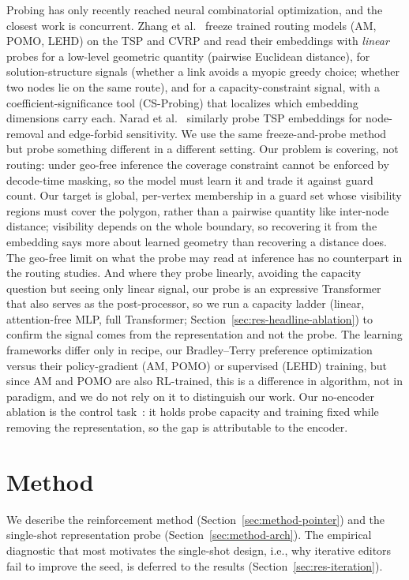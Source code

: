 \documentclass[11pt]{article}
\begin{document}
Probing has only recently reached neural combinatorial optimization, and the closest work is concurrent. Zhang et al.~\cite{Zhang2025ProbingNCO} freeze trained routing models (AM, POMO, LEHD) on the TSP and CVRP and read their embeddings with \emph{linear} probes for a low-level geometric quantity (pairwise Euclidean distance), for solution-structure signals (whether a link avoids a myopic greedy choice; whether two nodes lie on the same route), and for a capacity-constraint signal, with a coefficient-significance tool (CS-Probing) that localizes which embedding dimensions carry each. Narad et al.~\cite{Narad2026ProbingTSP} similarly probe TSP embeddings for node-removal and edge-forbid sensitivity. We use the same freeze-and-probe method but probe something different in a different setting. Our problem is covering, not routing: under geo-free inference the coverage constraint cannot be enforced by decode-time masking, so the model must learn it and trade it against guard count. Our target is global, per-vertex membership in a guard set whose visibility regions must cover the polygon, rather than a pairwise quantity like inter-node distance; visibility depends on the whole boundary, so recovering it from the embedding says more about learned geometry than recovering a distance does. The geo-free limit on what the probe may read at inference has no counterpart in the routing studies. And where they probe linearly, avoiding the capacity question but seeing only linear signal, our probe is an expressive Transformer that also serves as the post-processor, so we run a capacity ladder (linear, attention-free MLP, full Transformer; Section~\ref{sec:res-headline-ablation}) to confirm the signal comes from the representation and not the probe. The learning frameworks differ only in recipe, our Bradley--Terry preference optimization versus their policy-gradient (AM, POMO) or supervised (LEHD) training, but since AM and POMO are also RL-trained, this is a difference in algorithm, not in paradigm, and we do not rely on it to distinguish our work. Our no-encoder ablation is the control task~\cite{HewittLiang2019Probes}: it holds probe capacity and training fixed while removing the representation, so the gap is attributable to the encoder.

\section{Method}
\label{sec:method}

We describe the reinforcement method (Section~\ref{sec:method-pointer}) and the single-shot representation probe (Section~\ref{sec:method-arch}). The empirical diagnostic that most motivates the single-shot design, i.e., why iterative editors fail to improve the seed, is deferred to the results (Section~\ref{sec:res-iteration}).
\end{document}
